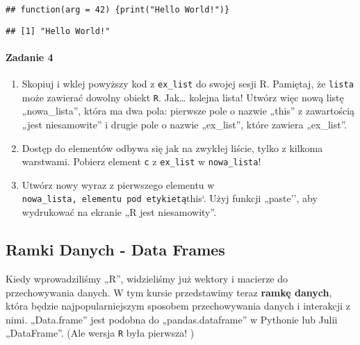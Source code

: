 \documentclass[
]{article}
\newenvironment{Shaded}{\begin{snugshade}}{\end{snugshade}}
\newcommand{\AttributeTok}[1]{\textcolor[rgb]{0.77,0.63,0.00}{#1}}
\newcommand{\DecValTok}[1]{\textcolor[rgb]{0.00,0.00,0.81}{#1}}
\newcommand{\FunctionTok}[1]{\textcolor[rgb]{0.00,0.00,0.00}{#1}}
\newcommand{\NormalTok}[1]{#1}
\newcommand{\SpecialCharTok}[1]{\textcolor[rgb]{0.00,0.00,0.00}{#1}}
\providecommand{\tightlist}{%
  \setlength{\itemsep}{0pt}\setlength{\parskip}{0pt}}
\begin{document}
\begin{verbatim}
## function(arg = 42) {print("Hello World!")}
\end{verbatim}

\begin{Shaded}
\end{Shaded}

\begin{verbatim}
## [1] "Hello World!"
\end{verbatim}

\hypertarget{zadanie-4}{%
\paragraph{Zadanie 4}\label{zadanie-4}}

\begin{enumerate}
\def\labelenumi{\arabic{enumi}.}
\tightlist
\item
  Skopiuj i wklej powyższy kod z \texttt{ex\_list} do swojej sesji R.
  Pamiętaj, że \texttt{lista} może zawierać dowolny obiekt \texttt{R}.
  Jak\ldots{} kolejna lista! Utwórz więc nową listę „nowa\_lista'',
  która ma dwa pola: pierwsze pole o nazwie „this'' z zawartością „jest
  niesamowite'' i drugie pole o nazwie „ex\_list'', które zawiera
  „ex\_list''.
\item
  Dostęp do elementów odbywa się jak na zwykłej liście, tylko z kilkoma
  warstwami. Pobierz element \texttt{c} z \texttt{ex\_list} w
  \texttt{nowa\_lista}!
\item
  Utwórz nowy wyraz z pierwszego elementu w
  \texttt{nowa\_lista\textquotesingle{},\ elementu\ pod\ etykietą}this`.
  Użyj funkcji „paste'', aby wydrukować na ekranie „R jest
  niesamowity''.
\end{enumerate}

\hypertarget{dataframes}{%
\subsection{Ramki Danych - Data Frames}\label{dataframes}}

Kiedy wprowadziliśmy „R'', widzieliśmy już wektory i macierze do
przechowywania danych. W tym kursie przedstawimy teraz \textbf{ramkę
danych}, która będzie najpopularniejszym sposobem przechowywania danych
i interakcji z nimi. „Data.frame'' jest podobna do „pandas.dataframe'' w
Pythonie lub Julii „DataFrame''. (Ale wersja \texttt{R} była pierwsza! )
\end{document}
